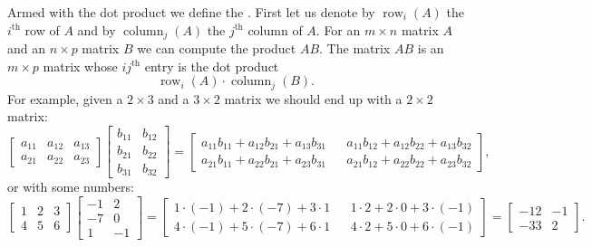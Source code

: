 Armed with the dot product we define the
\emph{}.
First let us denote by $\operatorname{row}_i(A)$ the $i^{\text{th}}$ row
of $A$ and by
$\operatorname{column}_j(A)$ the $j^{\text{th}}$ column of $A$.
For an $m \times n$ matrix $A$ and an $n \times p$ matrix $B$
we can compute the product $AB$.  The matrix $AB$ is an $m \times p$
matrix whose $ij^{\text{th}}$ entry is the dot product
\begin{equation*}
\operatorname{row}_i(A) \cdot
\operatorname{column}_j(B) .
\end{equation*}
For example, given a $2 \times 3$ and a $3 \times 2$ matrix
we should end up with a $2 \times 2$ matrix:
\begin{equation} \label{linalg:eqmatrixmulex}
\begin{bmatrix}
a_{11} & a_{12} & a_{13} \\
a_{21} & a_{22} & a_{23}
\end{bmatrix}
\begin{bmatrix}
b_{11} & b_{12} \\
b_{21} & b_{22} \\
b_{31} & b_{32}
\end{bmatrix}
=
\begin{bmatrix}
a_{11} b_{11} + 
a_{12} b_{21} + 
a_{13} b_{31} & &
a_{11} b_{12} + 
a_{12} b_{22} + 
a_{13} b_{32} \\
a_{21} b_{11} + 
a_{22} b_{21} + 
a_{23} b_{31} & &
a_{21} b_{12} + 
a_{22} b_{22} + 
a_{23} b_{32}
\end{bmatrix} ,
\end{equation}
or with some numbers:
\begin{equation*}
\begin{bmatrix}
1 & 2 & 3 \\
4 & 5 & 6
\end{bmatrix}
\begin{bmatrix}
-1 & 2 \\
-7 & 0 \\
1 & -1
\end{bmatrix}
=
\begin{bmatrix}
1\cdot (-1) + 2\cdot (-7) + 3 \cdot 1 &  &
1\cdot 2 + 2\cdot 0 + 3 \cdot (-1) \\
4\cdot (-1) + 5\cdot (-7) + 6 \cdot 1 &  &
4\cdot 2 + 5\cdot 0 + 6 \cdot (-1)
\end{bmatrix}
=
\begin{bmatrix}
-12 & -1 \\
-33 & 2
\end{bmatrix} .
\end{equation*}

